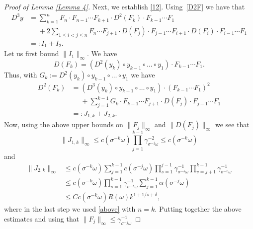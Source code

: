 \documentclass[10pt,a4paper]{amsart}
\def\om{\omega}
\begin{document}
\begin{proof}[Proof of Lemma \ref{Lemma 4}]
Next, we establish \eqref{12}.
Using~\eqref{D2F} we have that 
  \begin{equation}\label{D 3}
  \begin{split}
D^3y &=\sum_{k=1}^nF_n\cdot F_{n-1}\cdots F_{k+1}\cdot D^2(F_k)\cdot F_{k-1}\cdots F_1    \\  
&\phantom{=}+2\sum_{1\leq i<j\leq n}F_n\cdots F_{j+1}\cdot D(F_j) \cdot F_{j-1}\cdots F_{i+1}\cdot D(F_i)\cdot F_{i-1}\cdots F_1  \\
&=:I_1+I_2.
\end{split}
\end{equation}
  Let us first bound $\|I_1\|_\infty$. 
 We have 
 \begin{equation}\label{F 1}
D(F_k)=\left(D^2(y_k)\circ y_{k-1}\circ\ldots\circ y_1\right)\cdot F_{k-1}\cdots F_1.
 \end{equation}
  Thus, with $G_k :=D^2(y_k)\circ y_{k-1}\circ\ldots\circ y_1$ we have
 \begin{equation}\label{F 2}
 \begin{split}
D^2(F_k) &=\left(D^3(y_k)\circ y_{k-1}\circ\ldots \circ y_1\right)\cdot (F_{k-1}\cdots F_1)^2 \\
&\phantom{=}+\sum_{j=1}^{k-1}G_k\cdot F_{k-1}\cdots F_{j+1}\cdot D(F_j)\cdot F_{j-1}\cdots F_1 \\
&=:J_{1,k}+J_{2,k}.
\end{split}
\end{equation}
Now, using the above upper bounds on $\|F_{j}\|_\infty$ and $\|D(F_j)\|_\infty$ we see that
\begin{equation}\label{J k 1}
\|J_{1,k}\|_\infty\leq c(\sigma^{-k}\om)\prod_{j=1}^{k-1}\gamma_{\sigma^{-j}\om}^{-2}\leq c(\sigma^{-k}\om)   
\end{equation}
and 
\begin{equation}\label{J k 2}
\begin{split}
\|J_{2,k}\|_\infty &\leq c(\sigma^{-k}\om)  \sum_{j=1}^{k-1}c(\sigma^{-j}\om)\prod_{s=1}^{j-1}\gamma_{\sigma^{-s}\om}^{-1}\prod_{v=j+1}^{k-1}\gamma_{\sigma^{-v}\om}^{-1} \\
&\leq c(\sigma^{-k}\om)\prod_{s=1}^{k-1}\gamma_{\sigma^{-s}\om}^{-1}
\sum_{j=1}^{k-1}\alpha(\sigma^{-j}\omega) \\
&\leq Cc(\sigma^{-k}\om)R(\om)k^{1+1/s+\delta},
\end{split}
\end{equation}
where in the last step we used \eqref{above} with  $n=k$.
Putting together the above estimates and using that $\|F_j\|_\infty\leq \gamma_{\sigma^{-j}\om}^{-1}$

\end{proof}
\end{document}
